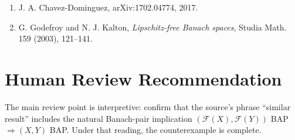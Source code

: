 \documentclass[11pt]{article}
\newcommand{\F}{\mathscr F}
\begin{document}
\begin{enumerate}
\item J. A. Chavez-Dominguez, arXiv:1702.04774, 2017.
\item G. Godefroy and N. J. Kalton,
\emph{Lipschitz-free Banach spaces},
Studia Math. 159 (2003), 121--141.
\end{enumerate}

\section*{Human Review Recommendation}

The main review point is interpretive: confirm that the source's phrase
``similar result'' includes the natural Banach-pair implication
\((\F(X),\F(Y))\) BAP \(\Rightarrow (X,Y)\) BAP. Under that reading, the
counterexample is complete.
\end{document}

